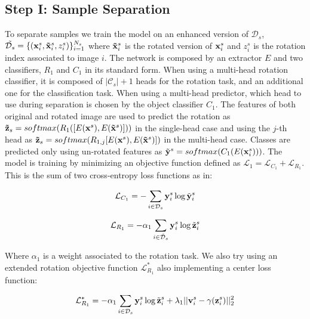 \documentclass[10pt,twocolumn,letterpaper]{article}
\begin{document}
\subsection{Step I: Sample Separation}

To separate samples we train the model on an enhanced version of $\mathcal{D}_s$, $\tilde{\mathcal{D}_s} = \{({\bf x}_i^s, {\bf \tilde x}_i^s, z_i^s)\}_{i=1}^{N_s}$ where ${\bf \tilde x}_i^s$ is the rotated version of ${\bf x}_i^s$ and $z_i^s$ is the rotation index associated to image $i$.
The network is composed by an extractor $E$ and two classifiers, $R_1$ and $C_1$ in its standard form.
When using a multi-head rotation classifier, it is composed of $|\mathcal{C}_s|+1$ heads for the rotation task, and an additional one for the classification task.
When using a multi-head predictor, which head to use during separation is chosen by the object classifier $C_1$.
The features of both original and rotated image are used to predict the rotation as ${\bf \tilde z}_s = softmax(R_1([E({\bf x}^s), E({\bf\tilde x}^s)]))$ in the single-head case and using the $j$-th head as ${\bf\tilde{z}}_s = softmax(R_{1,j}[E({\bf x}^s), E({\bf\tilde{x}}^s)])$ in the multi-head case.
Classes are predicted only using un-rotated features as $\tilde{\bf y}^s = softmax(C_1(E({\bf x}_i^s)))$.
The model is training by minimizing an objective function defined as $\mathcal{L}_1 = \mathcal{L}_{C_1} + \mathcal{L}_{R_1}$.
This is the sum of two cross-entropy loss functions as in:

\begin{equation}
  \mathcal{L}_{C_1} = -\sum_{i\in\mathcal{D}_s} {\bf y}_i^s \log \tilde{\bf y}_i^s
  \label{eq:baseloss_class}
\end{equation}

\begin{equation}
  \mathcal{L}_{R_1} = -\alpha_1\sum_{i\in\mathcal{\tilde{D}}_s} {\bf y}_i^s \log \tilde{{\bf z}}_i^s
  \label{eq:baseloss_rot}
\end{equation}

Where $\alpha_1$ is a weight associated to the rotation task.
We also try using an extended rotation objective function $\mathcal{L}_{R_1}^*$ also implementing a center loss function\cite{CenterLoss}:

\begin{equation}
  \mathcal{L}_{R_1}^* = -\alpha_1\sum_{i\in\mathcal{D}_s} {\bf y}_i^s \log \tilde{{\bf z}}_i^s+\lambda_1||{\bf v}_i^s-\gamma({\bf z}_i^s)||_2^2
  \label{eq:center_loss}
\end{equation}
\end{document}

